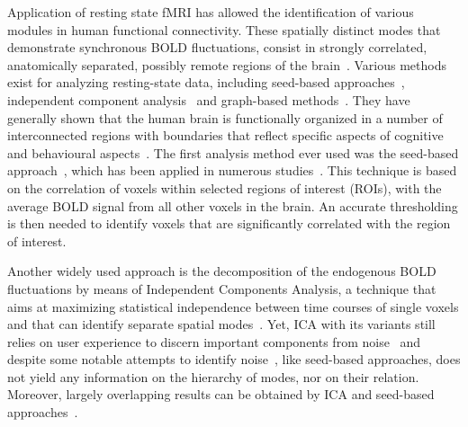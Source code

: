 Application of resting state fMRI has allowed the identification of various modules in human functional connectivity.
These spatially distinct modes that demonstrate synchronous BOLD fluctuations, consist in strongly correlated, anatomically separated, possibly remote regions of the brain~\cite{biswal1995,raichle2001,fox2005,biswal2012}.
Various methods exist for analyzing resting-state data, including seed-based approaches~\cite{biswal1995,raichle2001}, independent component analysis~\cite{beckmann2005,damoiseaux2006} and graph-based methods~\cite{stam2007,bullmore2009}. They have generally shown that the human brain is functionally organized in a number of interconnected regions with boundaries that reflect specific aspects of cognitive and behavioural aspects~\cite{tomasi2012,alnaes2015,crossley2013a}.
The first analysis method ever used was the seed-based approach~\cite{biswal1995}, which has been applied in numerous studies~\cite{raichle2001}.
This technique is based on the correlation of voxels within selected regions of interest (ROIs), with the average BOLD signal from all other voxels in the brain.
An accurate thresholding is then needed to identify voxels that are significantly correlated with the region of interest.

Another widely used approach is the decomposition of the endogenous BOLD fluctuations by means of Independent Components Analysis, a technique that aims at maximizing statistical independence between time courses of single voxels and that can identify separate spatial modes~\cite{damoiseaux2006,beckmann2005,calhoun2013}.
Yet, ICA with its variants still relies on user experience to discern important components from noise~\cite{lee2013} and despite some notable attempts to identify noise~\cite{thomas2002,tohka2008}, like seed-based approaches, does not yield any information on the hierarchy of modes, nor on their relation.
Moreover, largely overlapping results can be obtained by ICA and seed-based approaches~\cite{rosazza2012}.

